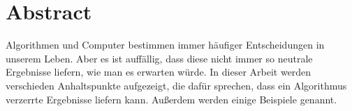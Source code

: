 \chapter*{Abstract}
Algorithmen und Computer bestimmen immer häufiger Entscheidungen in unserem Leben. Aber es ist auffällig, dass diese nicht immer so neutrale Ergebnisse liefern, wie man es erwarten würde.
\newline
In dieser Arbeit werden verschieden Anhaltspunkte aufgezeigt, die dafür sprechen, dass ein Algorithmus verzerrte Ergebnisse liefern kann. Außerdem werden einige Beispiele genannt.